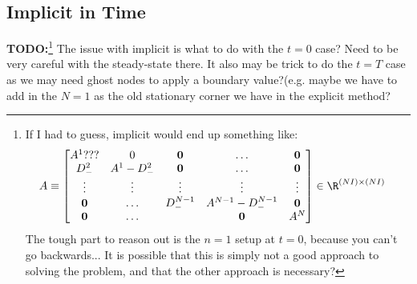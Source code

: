 \documentclass[11pt]{etk-article}
\begin{document}
\subsection{Implicit in Time}
\textbf{TODO:}\footnote{If I had to guess, implicit would end up something like:
\begin{align}
A &\equiv \begin{bmatrix}
A^1 ???	& 0		& \mathbf{0}			 & \ldots 			& \mathbf{0}\\
D_{-}^2 		&A^1 - D_{-}^2 & \mathbf{0}				 & \ldots			 & \mathbf{0}\\	
\vdots 			& \vdots 		& \vdots				& \vdots			&\vdots\\
\mathbf{0} 		&\ldots 	 	& D_{-}^{N-1}			& A^{N-1} - D_{-}^{N-1} &\mathbf{0}	\\
\mathbf{0} 		&\ldots 		&						& \mathbf{0}	&A^N
\end{bmatrix}\in\R^{(N I)\times (N I)}
\end{align}
The tough part to reason out is the $n=1$ setup at $t=0$, because you can't go backwards...  It is possible that this is simply not a good approach to solving the problem, and that the other approach is necessary?}
The issue with implicit is what to do with the $t=0$ case?  Need to be very careful with the steady-state there.  It also may be trick to do the $t=T$ case as we may need ghost nodes to apply a boundary value?(e.g. maybe we have to add in the $N=1$ as the old stationary corner we have in the explicit method?


\end{document}
